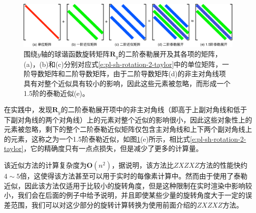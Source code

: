\begin{figure}
\begin{fullwidth}
	\includegraphics[width=1.0\thewidth]{figures/prt/15-taylor}
	\caption{围绕$y$轴的球谐函数旋转矩阵$\mathbf{R}_y$的二阶泰勒展开及其各项的矩阵，(a)，(b)和(c)分别对应式\ref{e:pl-sh-rotation-2-taylor}中的单位矩阵，一阶导数矩阵和二阶导数矩阵，由于二阶导数矩阵(d)的非主对角线项具有对整个近似具有较小的影响，因此这些元素被忽略，而形成一个1.5阶的泰勒近似(e)。}
	\label{f:pl-15-taylor}
\end{fullwidth}
\end{figure}

在实践中，\cite{a:FastApproximationtoSphericalHarmonicRotation}发现$\mathbf{R}_y$的二阶泰勒展开项中的非主对角线（即高于上副对角线和低于下副对角线的两个对角线）上的元素对整个近似的影响很小，因此这些对象性上的元素被忽略，剩下的整个二阶泰勒近似矩阵仅包含主对角线和上下两个副对角线上的元素，这称之为一个1.5阶泰勒近似，如图\ref{f:pl-15-taylor}(e)所示，相比式\ref{e:pl-sh-rotation-2-taylor}，它的精确度只有一点点损失，但是减少了更多的计算量。

该近似方法的计算复杂度为$\mathbf{O}(n^{2})$，据\cite{a:FastApproximationtoSphericalHarmonicRotation}说明，该方法比$ZXZXZ$方法的性能快约$4\sim 5$倍，这使得该方法甚至可以用于实时的每像素计算中。然而由于使用了泰勒近似，因此该方法仅适用于比较小的旋转角度，但是这种限制在实时渲染中影响较小，我们会在后面的例子中给予说明，并且即使某些少量的旋转角度大于一定的误差范围，我们可以对这少部分的旋转计算转换为使用前面介绍的$ZXZXZ$方法。

